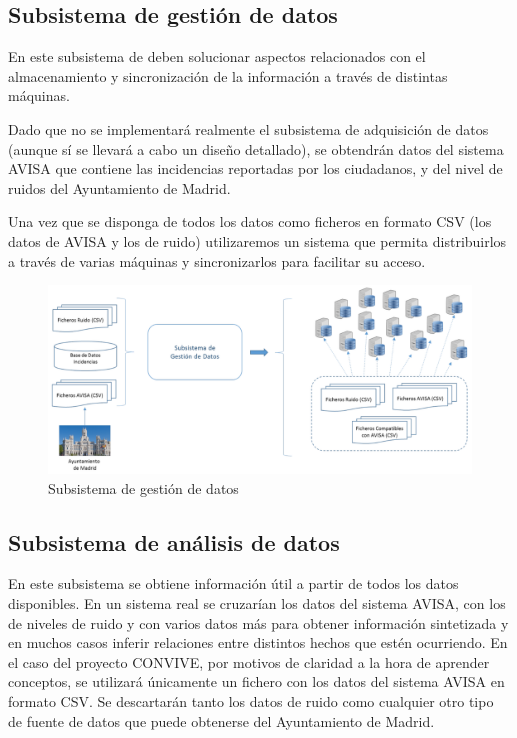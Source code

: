 \documentclass[
  a4paper,
]{scrreport}
\begin{document}
\subsection{Subsistema de gestión de
datos}\label{subsistema-de-gestiuxf3n-de-datos}

En este subsistema de deben solucionar aspectos relacionados con el
almacenamiento y sincronización de la información a través de distintas
máquinas.

Dado que no se implementará realmente el subsistema de adquisición de
datos (aunque sí se llevará a cabo un diseño detallado), se obtendrán
datos del sistema AVISA que contiene las incidencias reportadas por los
ciudadanos, y del nivel de ruidos del Ayuntamiento de Madrid.

Una vez que se disponga de todos los datos como ficheros en formato CSV
(los datos de AVISA y los de ruido) utilizaremos un sistema que permita
distribuirlos a través de varias máquinas y sincronizarlos para
facilitar su acceso.

\begin{figure}[H]

{\centering \includegraphics{../img/convive/subsistema-gestion-datos.png}

}

\caption{Subsistema de gestión de datos}

\end{figure}%

\subsection{Subsistema de análisis de
datos}\label{subsistema-de-anuxe1lisis-de-datos}

En este subsistema se obtiene información útil a partir de todos los
datos disponibles. En un sistema real se cruzarían los datos del sistema
AVISA, con los de niveles de ruido y con varios datos más para obtener
información sintetizada y en muchos casos inferir relaciones entre
distintos hechos que estén ocurriendo. En el caso del proyecto CONVIVE,
por motivos de claridad a la hora de aprender conceptos, se utilizará
únicamente un fichero con los datos del sistema AVISA en formato CSV. Se
descartarán tanto los datos de ruido como cualquier otro tipo de fuente
de datos que puede obtenerse del Ayuntamiento de Madrid.
\end{document}
